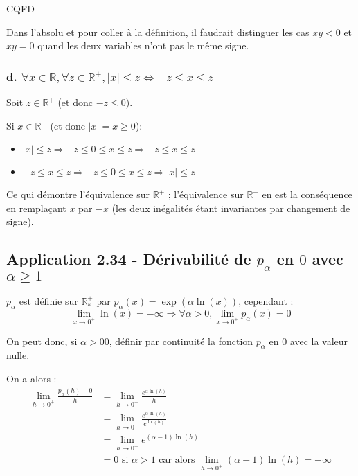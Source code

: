 \documentclass{report}
\begin{document}
CQFD

Dans l'absolu et pour coller à la définition, il faudrait distinguer les cas $xy<0$ et $xy=0$ quand les deux variables n'ont pas
le même signe.


\subsubsection*{d. $\forall x \in \mathbb{R}, \forall z \in \mathbb{R}^{+}, |x| \leq z \Longleftrightarrow -z \leq x \leq z$}

Soit $z \in \mathbb{R}^{+}$ (et donc $-z \leq 0$).

Si $x \in \mathbb{R}^{+}$ (et donc $|x|=x \geq 0$):

\begin{itemize}
	\item $|x| \leq z \Longrightarrow -z \leq 0 \leq x \leq z \Longrightarrow -z \leq x \leq z$
	\item $-z \leq x \leq z \Longrightarrow -z \leq 0 \leq x \leq z \Longrightarrow |x| \leq z$
\end{itemize}

Ce qui démontre l'équivalence sur $\mathbb{R}^{+}$ ; l'équivalence sur $\mathbb{R}^{-}$ en est la conséquence
en remplaçant $x$ par $-x$ (les deux inégalités étant invariantes par changement de signe).


\subsection*{Application 2.34 - Dérivabilité de $p_{\alpha}$ en $0$ avec $\alpha \geq 1$}

$p_{\alpha}$ est définie sur $\mathbb{R}^{+}_{*}$ par $p_{\alpha}(x) = \exp(\alpha \ln(x))$, cependant :
\begin{displaymath}
	\lim_{x\rightarrow 0^{+}} \ln(x) = -\infty \Longrightarrow\forall \alpha>0, \lim_{x\rightarrow 0^{+}} p_{\alpha}(x) = 0
\end{displaymath}

On peut donc, si $\alpha > 0 0$, définir par continuité la fonction $p_{\alpha}$ en $0$ avec la valeur nulle.

On a alors :
\begin{equation*}
	\begin{split}
		\lim_{h\rightarrow 0^{+}} \frac{p_{\alpha}(h) - 0}{h}
		&= \lim_{h\rightarrow 0^{+}} \frac{e^{\alpha \ln(h)}}{h} \\
		&= \lim_{h\rightarrow 0^{+}} \frac{e^{\alpha \ln(h)}}{e^{\ln(h)}} \\
		&= \lim_{h\rightarrow 0^{+}} e^{(\alpha-1) \ln(h)} \\
		&=0 \text{ si $\alpha >1$ car alors $\lim_{h\rightarrow 0^{+}} (\alpha-1) \ln(h) = -\infty$}
	\end{split}
\end{equation*}
\end{document}
